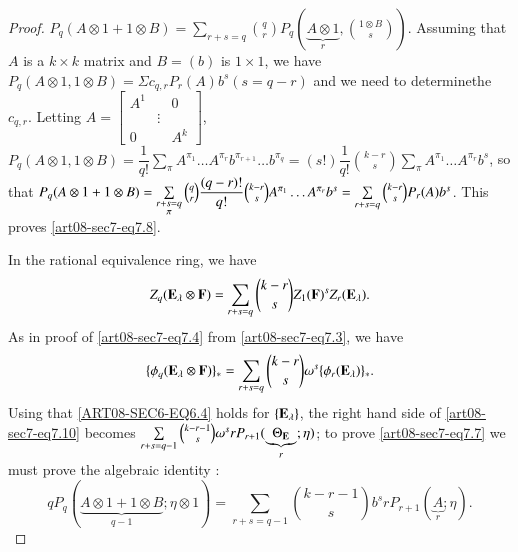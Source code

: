 \begin{proof}
$P_{q}(A\otimes 1+1\otimes B)=\sum\limits_{r+s=q}\binom{q}{r}P_{q}(\underbrace{A\otimes 1}_{r},\binom{1\otimes B}{s})$. Assuming that $A$ is a $k\times k$ matrix and $B=(b)$ is $1\times 1$, we have $P_{q}(A\otimes 1,1\otimes B)=\Sigma c_{q,r}P_{r}(A)b^{s}(s=q-r)$ and we need to determine\pageoriginale the $c_{q,r}$. Letting $A=\left[\begin{matrix} A^{1} & & 0\\  & \vdots &\\0 & & A^{k} \end{matrix}\right]$, $P_{q}(A\otimes 1,1\otimes B)=\dfrac{1}{q!}\sum\limits_{\pi}A^{\pi_{1}}\ldots A^{\pi_{r}}b^{\pi_{r+1}}\ldots b^{\pi_{q}}=(s!)\dfrac{1}{q!}\binom{k-r}{s}\sum\limits_{\pi}A^{\pi_{1}}\ldots A^{\pi_{r}}b^{s}$, so that $P_{q}(A\otimes 1+1\otimes B)=\sum\limits_{\substack{r+s=q\\ \pi}}\break \binom{q}{r}\dfrac{(q-r)!}{q!}\binom{k-r}{s}A^{\pi_{1}}\ldots A^{\pi_{r}}b^{s}=\sum\limits_{r+s=q}\binom{k-r}{s}P_{r}(A)b^{s}$. This proves \eqref{art08-sec7-eq7.8}.

In the rational equivalence ring, we have
\begin{equation}
Z_{q}(\mathbf{E}_{\lambda}\otimes \mathbf{F})=\sum\limits_{r+s=q}\binom{k-r}{s}Z_{1}(\mathbf{F})^{s}Z_{r}(\mathbf{E}_{\lambda}).\label{art08-sec7-eq7.9}
\end{equation}
As in proof of \eqref{art08-sec7-eq7.4} from \eqref{art08-sec7-eq7.3}, we have
\begin{equation}
\{\phi_{q}(\mathbf{E}_{\lambda}\otimes \mathbf{F})\}_{\ast}=\sum\limits_{r+s=q}\binom{k-r}{s}\omega^{s}\{\phi_{r}(\mathbf{E}_{\lambda})\}_{*}.\label{art08-sec7-eq7.10}
\end{equation}
Using that \eqref{ART08-SEC6-EQ6.4} holds for $\{\mathbf{E}_{\lambda}\}$, the right hand side of \eqref{art08-sec7-eq7.10} becomes $\sum\limits_{r+s=q-1}\binom{k-r-1}{s}\omega^{s}rP_{r+1}(\underbrace{\Theta_{\mathbf{E}}}_{r};\eta)$; to prove \eqref{art08-sec7-eq7.7} we must prove the algebraic identity :
\begin{equation}
qP_{q}(\underbrace{A\otimes 1+1\otimes B}_{q-1};\eta\otimes 1)=\sum\limits_{r+s=q-1}\binom{k-r-1}{s}b^{s}rP_{r+1}(\underbrace{A}_{r};\eta).\label{art08-sec7-eq7.11}
\end{equation}
\end{proof}

